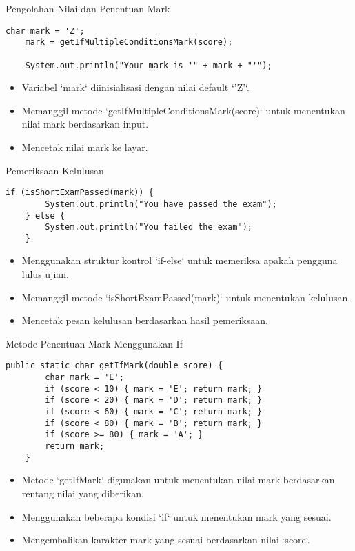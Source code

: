 \documentclass[aspectratio=169, table]{beamer}
\begin{document}
\begin{frame}[fragile]{Pengolahan Nilai dan Penentuan Mark}
\begin{lstlisting}[style=JavaStyle, caption={Pengolahan Nilai dan Penentuan Mark}]
	char mark = 'Z';
	mark = getIfMultipleConditionsMark(score);
	
	System.out.println("Your mark is '" + mark + "'");
\end{lstlisting}
\begin{itemize}
	\item Variabel `mark` diinisialisasi dengan nilai default `'Z'`.
	\item Memanggil metode `getIfMultipleConditionsMark(score)` untuk menentukan nilai mark berdasarkan input.
	\item Mencetak nilai mark ke layar.
\end{itemize}
\end{frame}

\begin{frame}[fragile]{Pemeriksaan Kelulusan}
\begin{lstlisting}[style=JavaStyle]
	if (isShortExamPassed(mark)) {
		System.out.println("You have passed the exam");
	} else {
		System.out.println("You failed the exam");
	}
\end{lstlisting}
\begin{itemize}
	\item Menggunakan struktur kontrol `if-else` untuk memeriksa apakah pengguna lulus ujian.
	\item Memanggil metode `isShortExamPassed(mark)` untuk menentukan kelulusan.
	\item Mencetak pesan kelulusan berdasarkan hasil pemeriksaan.
\end{itemize}
\end{frame}

\begin{frame}[fragile]{Metode Penentuan Mark Menggunakan If}
\vspace{20pt}
\begin{lstlisting}[style=JavaStyle]
	public static char getIfMark(double score) {
		char mark = 'E';
		if (score < 10) { mark = 'E'; return mark; }
		if (score < 20) { mark = 'D'; return mark; }
		if (score < 60) { mark = 'C'; return mark; }
		if (score < 80) { mark = 'B'; return mark; }
		if (score >= 80) { mark = 'A'; }
		return mark;
	}
\end{lstlisting}
\begin{itemize}
	\item Metode `getIfMark` digunakan untuk menentukan nilai mark berdasarkan rentang nilai yang diberikan.
	\item Menggunakan beberapa kondisi `if` untuk menentukan mark yang sesuai.
	\item Mengembalikan karakter mark yang sesuai berdasarkan nilai `score`.
\end{itemize}
\end{frame}
\end{document}
